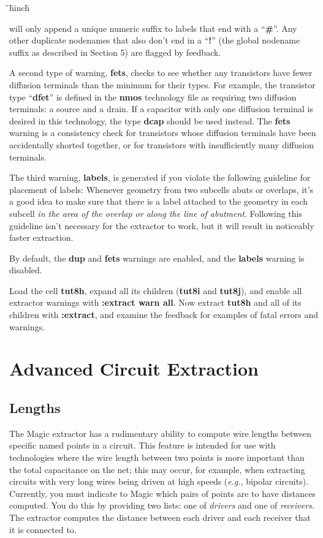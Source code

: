 \documentclass[letterpaper,twoside,12pt]{article}
\def\hinch{\hspace*{0.5in}}
\def\starti{\begin{center}\begin{tabbing}\hinch\=\hinch\=\hinch\=hinch\hinch\=\kill}
\def\endi{\end{tabbing}\end{center}}
\def\ii{\>\>\>}
\begin{document}
\starti
   \ii {\bfseries :extract unique \#}
\endi

will only 
append a unique numeric suffix to labels that end with a ``{\bfseries \#}''.
Any other duplicate nodenames that also don't end in a ``{\bfseries !}''
(the global nodename suffix as described in Section 5)
are flagged by feedback.  

A second type of warning, {\bfseries fets}, checks to see whether any transistors
have fewer diffusion terminals than the minimum for their types.
For example, the transistor type ``{\bfseries dfet}'' is defined in
the {\bfseries nmos} technology file as requiring two diffusion terminals:
a source and a drain.
If a capacitor with only one diffusion terminal is desired in this
technology, the type {\bfseries dcap} should be used instead.
The {\bfseries fets} warning is a consistency check for transistors
whose diffusion terminals have been accidentally shorted together,
or for transistors with insufficiently many diffusion terminals.

The third warning, {\bfseries labels},
is generated if you violate the following
guideline for placement of labels:
Whenever geometry from two subcells abuts or overlaps,
it's a good idea to make sure that
there is a label attached to the geometry in each subcell
{\itshape in the area of the overlap or along the line of abutment}.
Following this guideline isn't necessary for the extractor to work,
but it will result in noticeably faster extraction.

By default, the {\bfseries dup} and {\bfseries fets} warnings are enabled,
and the {\bfseries labels} warning is disabled.

Load the cell {\bfseries tut8h}, expand all its children ({\bfseries tut8i} and
{\bfseries tut8j}), and enable
all extractor warnings with {\bfseries :extract warn all}.
Now extract {\bfseries tut8h} and all of its children with
{\bfseries :extract}, and examine the feedback for examples of
fatal errors and warnings.

\section{Advanced Circuit Extraction}

\subsection{Lengths}

The Magic extractor has a rudimentary ability to compute wire lengths
between specific named points in a circuit.  This feature is intended for
use with technologies where the wire length between two points is
more important than the total capacitance on the net; this may
occur, for example, when extracting circuits with very long wires
being driven at high speeds ({\itshape e.g.}, bipolar circuits).
Currently, you must indicate to Magic which pairs of points are
to have distances computed.  You do this by providing two lists:
one of {\itshape drivers} and one of {\itshape receivers}.  The extractor
computes the distance between each driver and each receiver
that it is connected to.
\end{document}

